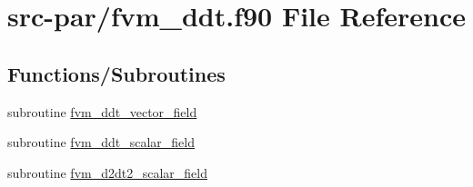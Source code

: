 \hypertarget{fvm__ddt_8f90}{\section{src-\/par/fvm\-\_\-ddt.f90 File Reference}
\label{fvm__ddt_8f90}
}
\subsection*{Functions/\-Subroutines}
\begin{DoxyCompactItemize}
\item 
subroutine \hyperlink{fvm__ddt_8f90_a844eb2126ce913f4d9a8d1db8750fffc}{fvm\-\_\-ddt\-\_\-vector\-\_\-field}
\item 
subroutine \hyperlink{fvm__ddt_8f90_a0e110792293b4062612ca0e7b5860c2d}{fvm\-\_\-ddt\-\_\-scalar\-\_\-field}
\item 
subroutine \hyperlink{fvm__ddt_8f90_a20a11841b21416b0b2b09c742ac97414}{fvm\-\_\-d2dt2\-\_\-scalar\-\_\-field}
\end{DoxyCompactItemize}


